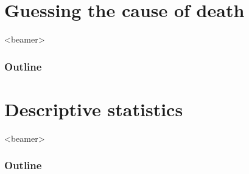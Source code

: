 \documentclass[xcolor=table]{beamer}
\begin{document}
\section{Guessing the cause of death}
{
     \begin{frame}<beamer>
     \frametitle{Outline}
     \tableofcontents[currentsection]
     \end{frame}
}
\subsection{}
\begin{frame}
  
\end{frame}

\section{Descriptive statistics}
{
     \begin{frame}<beamer>
     \frametitle{Outline}
     \tableofcontents[currentsection]
     \end{frame}
}
\subsection{}
\begin{frame}
  
\end{frame}
\end{document}
